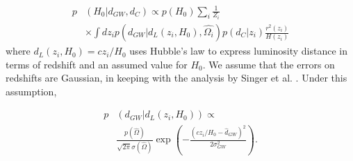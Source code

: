 \begin{align}
     p&(H_0|d_{GW}, d_C)\propto p(H_0) \sum_i \frac{1}{Z_i} \nonumber\\
     &\times \int dz_i p\left(d_{GW}|d_L(z_i, H_0), \hat{\Omega_{i}}\right)p(d_C|z_i)\frac{r^2 (z_i)}{H(z_i)}
    \label{eq: finaleq}
\end{align}
where $d_L(z_i, H_0) = cz_i / H_0$ uses Hubble's law to express luminosity distance in terms of redshift and an assumed value for $H_0$. We assume that the errors on redshifts are Gaussian, in keeping with the analysis by Singer et al. \cite{Singer_2016}. Under this assumption,

\begin{align}
    p&\left(d_{GW}|d_L(z_i, H_0)\right)\propto \nonumber\\
    &\frac{p(\hat{\Omega})}{\sqrt{2\pi}\sigma(\hat{\Omega})} \exp\left(-\frac{(cz_i/H_0 - \hat{d}_{GW})^2}{2\sigma_{GW}^2}\right).
    \label{eq:GW_like}
\end{align}
